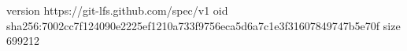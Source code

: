version https://git-lfs.github.com/spec/v1
oid sha256:7002cc7f124090e2225ef1210a733f9756eca5d6a7c1e3f31607849747b5e70f
size 699212
